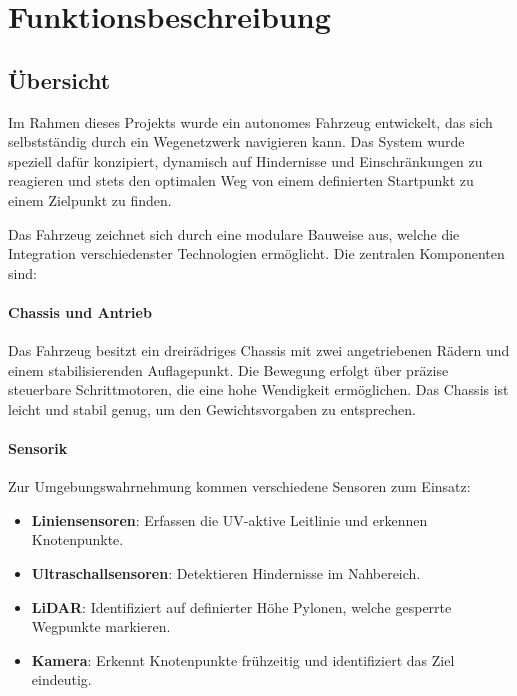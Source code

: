 \documentclass[main.tex]{subfiles} %
\begin{document}

\section{Funktionsbeschreibung}

\subsection{Übersicht}

Im Rahmen dieses Projekts wurde ein autonomes Fahrzeug entwickelt, das sich selbstständig 
durch ein Wegenetzwerk navigieren kann. Das System wurde speziell dafür konzipiert, dynamisch 
auf Hindernisse und Einschränkungen zu reagieren und stets den optimalen Weg von einem 
definierten Startpunkt zu einem Zielpunkt zu finden.

Das Fahrzeug zeichnet sich durch eine modulare Bauweise aus, welche die Integration verschiedenster 
Technologien ermöglicht. Die zentralen Komponenten sind:

\paragraph{Chassis und Antrieb}

Das Fahrzeug besitzt ein dreirädriges Chassis mit zwei angetriebenen Rädern und einem 
stabilisierenden Auflagepunkt. Die Bewegung erfolgt über präzise steuerbare Schrittmotoren, 
die eine hohe Wendigkeit ermöglichen. Das Chassis ist leicht und stabil genug, um den 
Gewichtsvorgaben zu entsprechen.

\paragraph{Sensorik}

Zur Umgebungswahrnehmung kommen verschiedene Sensoren zum Einsatz:

\begin{itemize}
  \item \textbf{Liniensensoren}: Erfassen die UV-aktive Leitlinie und erkennen Knotenpunkte.
  \item \textbf{Ultraschallsensoren}: Detektieren Hindernisse im Nahbereich.
  \item \textbf{LiDAR}: Identifiziert auf definierter Höhe Pylonen, welche gesperrte Wegpunkte markieren.
  \item \textbf{Kamera}: Erkennt Knotenpunkte frühzeitig und identifiziert das Ziel eindeutig.
\end{itemize}
\end{document}

